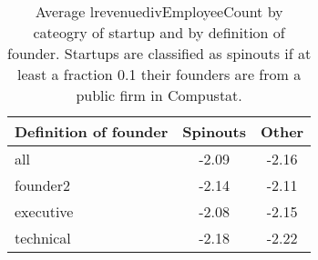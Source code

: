 \begin{table}[!htb]
\centering
\begingroup\small
\begin{tabular}{p{1.5cm}cc}
  \toprule
Definition of founder & Spinouts & Other \\ 
  \midrule
all & -2.09 & -2.16 \\ 
  founder2 & -2.14 & -2.11 \\ 
  executive & -2.08 & -2.15 \\ 
  technical & -2.18 & -2.22 \\ 
   \bottomrule
\end{tabular}
\endgroup
\caption{Average lrevenuedivEmployeeCount by cateogry of startup and by definition of founder. Startups are classified as spinouts if at least a fraction 0.1 their founders are from a public firm in Compustat.} 
\label{table:raw_comparison_lrevenuedivEmployeeCount}
\end{table}
